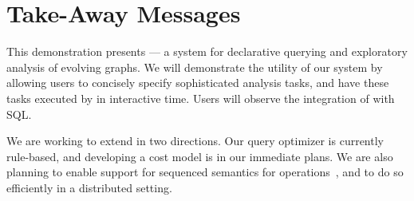 \section{Take-Away Messages}
\label{sec:conc}

This demonstration presents \sys --- a system for declarative querying
and exploratory analysis of evolving graphs.  We will demonstrate the
utility of our system by allowing users to concisely specify
sophisticated analysis tasks, and have these tasks executed by \sys in
interactive time.  Users will observe the integration of \ql with SQL.

We are working to extend \sys in two directions.  Our query optimizer
is currently rule-based, and developing a cost model is in our
immediate plans.  We are also planning to enable support for sequenced
semantics for \tga operations~\cite{MoffittEDBT17}, and to do so
efficiently in a distributed setting.

